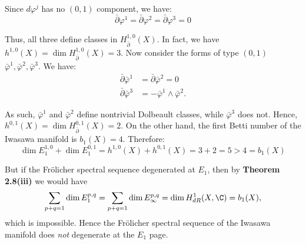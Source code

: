 \noindent Since $d\varphi^j$ has no $(0,1)$ component, we have:
$$
\bar\partial \varphi^1=\bar\partial \varphi^2=\bar\partial \varphi^3=0
$$

\noindent Thus, all three define classes in $H_{\bar\partial}^{1,0}(X)$. In fact, we have $h^{1,0}(X)=\dim H_{\bar\partial}^{1,0}(X)=3$. Now consider the forms of type $(0,1)$ $\bar\varphi^1,\bar\varphi^2,\bar\varphi^3$. We have:
\begin{align*}
\bar\partial \bar\varphi^1&=\bar\partial \bar\varphi^2=0 \\
\bar\partial \bar\varphi^3 &= -\bar\varphi^1\wedge \bar\varphi^2.
\end{align*}

\noindent As such, $\bar\varphi^1$ and $\bar\varphi^2$ define nontrivial Dolbeault classes, while $\bar\varphi^3$ does not. Hence, $h^{0,1}(X)=\dim H_{\bar\partial}^{0,1}(X)=2$. On the other hand, the first Betti number of the Iwasawa manifold is $b_1(X) = 4$. Therefore:
$$
\dim E_1^{1,0}+\dim E_1^{0,1} = h^{1,0}(X)+h^{0,1}(X) = 3+2 = 5 > 4 = b_1(X)
$$

\noindent But if the Fr\"olicher spectral sequence degenerated at $E_1$, then by \textbf{Theorem 2.8(iii)} we would have
$$
\sum_{p+q=1}\dim E_1^{p,q} = \sum_{p+q=1}\dim E_\infty^{p,q} = \dim H^1_{dR}(X,\C) = b_1(X),
$$
which is impossible. Hence the Fr\"olicher spectral sequence of the Iwasawa manifold does \emph{not}
degenerate at the $E_1$ page.
